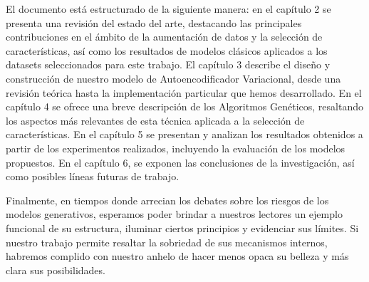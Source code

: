 El documento está estructurado de la siguiente manera: en el capítulo 2 se presenta una revisión del estado del arte, destacando las principales contribuciones en el ámbito de la aumentación de datos y la selección de características, así como los resultados de modelos clásicos aplicados a los datasets seleccionados para este trabajo. El capítulo 3 describe el diseño y construcción de nuestro modelo de Autoencodificador Variacional, desde una revisión teórica hasta la implementación particular que hemos desarrollado. En el capítulo 4 se ofrece una breve descripción de los Algoritmos Genéticos, resaltando los aspectos más relevantes de esta técnica aplicada a la selección de características. En el capítulo 5 se presentan y analizan los resultados obtenidos a partir de los experimentos realizados, incluyendo la evaluación de los modelos propuestos. En el capítulo 6, se exponen las conclusiones de la investigación, así como posibles líneas futuras de trabajo.

Finalmente, en tiempos donde arrecian los debates sobre los riesgos de los modelos generativos, esperamos poder brindar a nuestros lectores un ejemplo funcional de su estructura, iluminar ciertos principios y evidenciar sus límites. Si nuestro trabajo permite resaltar la sobriedad de sus mecanismos internos, habremos complido con nuestro anhelo de hacer menos opaca su belleza y más clara sus posibilidades.